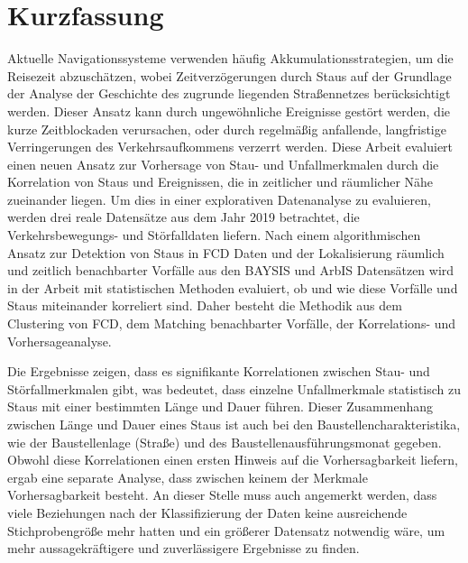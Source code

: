 \cleardoubleoddpage

\chapter*{Kurzfassung}
\thispagestyle{empty} %
Aktuelle Navigationssysteme verwenden häufig Akkumulationsstrategien, um die Reisezeit abzuschätzen, wobei Zeitverzögerungen durch Staus auf der Grundlage der Analyse der Geschichte des zugrunde liegenden Straßennetzes berücksichtigt werden. Dieser Ansatz kann durch ungewöhnliche Ereignisse gestört werden, die kurze Zeitblockaden verursachen, oder durch regelmäßig anfallende, langfristige Verringerungen des Verkehrsaufkommens verzerrt werden. Diese Arbeit evaluiert einen neuen Ansatz zur Vorhersage von Stau- und Unfallmerkmalen durch die Korrelation von Staus und Ereignissen, die in zeitlicher und räumlicher Nähe zueinander liegen. Um dies in einer explorativen Datenanalyse zu evaluieren, werden drei reale Datensätze aus dem Jahr 2019 betrachtet, die Verkehrsbewegungs- und Störfalldaten liefern. Nach einem algorithmischen Ansatz zur Detektion von Staus in FCD Daten und der Lokalisierung räumlich und zeitlich benachbarter Vorfälle aus den BAYSIS und ArbIS Datensätzen wird in der Arbeit mit statistischen Methoden evaluiert, ob und wie diese Vorfälle und Staus miteinander korreliert sind. Daher besteht die Methodik aus dem Clustering von FCD, dem Matching benachbarter Vorfälle, der Korrelations- und Vorhersageanalyse.

Die Ergebnisse zeigen, dass es signifikante Korrelationen zwischen Stau- und Störfallmerkmalen gibt, was bedeutet, dass einzelne Unfallmerkmale statistisch zu Staus mit einer bestimmten Länge und Dauer führen. Dieser Zusammenhang zwischen Länge und Dauer eines Staus ist auch bei den Baustellencharakteristika, wie der Baustellenlage (Straße) und des Baustellenausführungsmonat gegeben. Obwohl diese Korrelationen einen ersten Hinweis auf die Vorhersagbarkeit liefern, ergab eine separate Analyse, dass zwischen keinem der Merkmale Vorhersagbarkeit besteht. An dieser Stelle muss auch angemerkt werden, dass viele Beziehungen nach der Klassifizierung der Daten keine ausreichende Stichprobengröße mehr hatten und ein größerer Datensatz notwendig wäre, um mehr aussagekräftigere und zuverlässigere Ergebnisse zu finden.